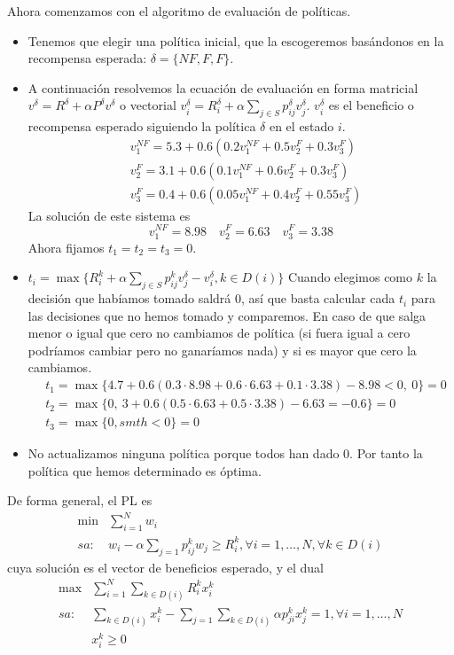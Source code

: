 \documentclass[twoside]{article}
\begin{document}
\begin{ejercicio}{2}
\begin{solucion}
Ahora comenzamos con el algoritmo de evaluación de políticas. 
\begin{itemize}
\item Tenemos que elegir una política inicial, que la escogeremos basándonos en la recompensa esperada: $\delta=\{NF, F, F\}$.
\item  A continuación resolvemos la ecuación de evaluación en forma matricial $v^\delta=R^\delta+\alpha P^\delta v^\delta$ o vectorial $v^\delta_i=R^\delta_i+\alpha\sum_{j\in S}p_{ij}^\delta v_j^\delta$. $v_i^{\delta}$ es el beneficio o recompensa esperado siguiendo la política $\delta$ en el estado $i$.
\begin{align*}
&v^{NF}_1=5.3+0.6(0.2v_1^{NF}+0.5v_2^{F}+0.3v^F_3)\\
&v_2^F=3.1+0.6(0.1v_1^{NF}+0.6v_2^F+0.3v_3^F)\\
&v_3^F=0.4+0.6(0.05v_1^{NF}+0.4v_2^F+0.55v_3^F)
\end{align*}
La solución de este sistema es
\[
v_1^{NF}=8.98\quad v_2^F=6.63\quad v_3^F=3.38
\]
Ahora fijamos $t_1=t_2=t_3=0$.
\item $t_i=\max\{R_i^k+\alpha\sum_{j\in S}p_{ij}^kv_j^\delta-v_i^\delta, k\in D(i)\}$
Cuando elegimos como $k$ la decisión que habíamos tomado saldrá 0, así que basta calcular cada $t_i$ para las decisiones que no hemos tomado y comparemos. En caso de que salga menor o igual que cero no cambiamos de política (si fuera igual a cero podríamos cambiar pero no ganaríamos nada) y si es mayor que cero la cambiamos.
\begin{align*}
&t_1=\max\{4.7+0.6(0.3\cdot 8.98+0.6\cdot 6.63+0.1\cdot 3.38)-8.98<0,\ 0\}=0 \\
&t_2=\max\{0,\ 3+0.6(0.5\cdot 6.63+0.5\cdot 3.38)-6.63=-0.6\}=0\\
&t_3=\max\{0, smth<0\}=0
\end{align*}
\item No actualizamos ninguna política porque todos han dado 0. Por tanto la política que hemos determinado es óptima.
\end{itemize}

De forma general, el PL es
\begin{align*}
\min & \sum_{i=1}^N w_i\\
sa:  & w_i-\alpha\sum_{j=1}p_{ij}^kw_j\geq R_i^k, \forall i=1,\dots, N,\forall k\in D(i)
\end{align*}
cuya solución es el vector de beneficios esperado, y el dual
\begin{align*}
\max & \sum_{i=1}^N\sum_{k\in D(i)}R^k_ix_i^k\\
sa: & \sum_{k\in D(i)}x_i^k-\sum_{j=1}\sum_{k\in D(i)}\alpha p_{ji}^kx_j^k=1, \forall i=1,\dots, N\\
    & x^k_i\geq 0
\end{align*}


\end{solucion}
\end{ejercicio}
\end{document}

